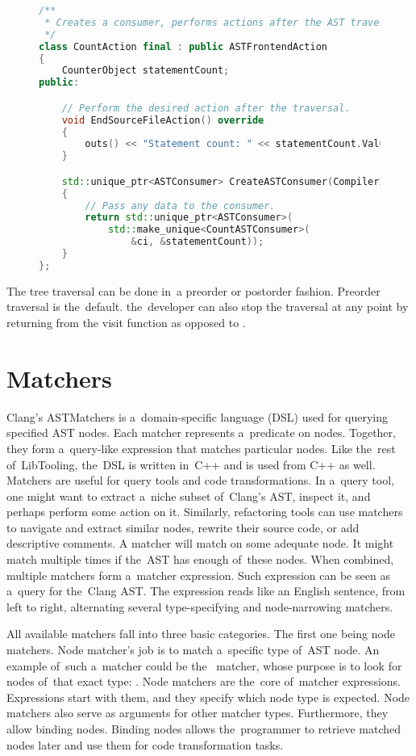 \begin{figure}[ht]\centering
\begin{lstlisting}[caption=ASTFrontendAction., language=C++, 
label={lst:astfrontendaction}]
/**
 * Creates a consumer, performs actions after the AST traversal.
 */
class CountAction final : public ASTFrontendAction
{
	CounterObject statementCount;
public:

	// Perform the desired action after the traversal.
	void EndSourceFileAction() override
	{
		outs() << "Statement count: " << statementCount.Value << "\n";
	}

	std::unique_ptr<ASTConsumer> CreateASTConsumer(CompilerInstance& ci, StringRef file) override
	{
		// Pass any data to the consumer.
		return std::unique_ptr<ASTConsumer>(
			std::make_unique<CountASTConsumer>(
				&ci, &statementCount));
	}
};
\end{lstlisting}
\end{figure}

The tree traversal can be done in~a preorder or postorder fashion. 
Preorder traversal is the~default. the~developer can also stop
the traversal at any point by returning  from
the visit function as opposed to .

\section{Matchers}

Clang's ASTMatchers \citep{matchers:online} 
is a~domain-specific language (DSL) used for querying 
specified AST nodes. 
Each matcher represents a~predicate on nodes. 
Together, they form a~query-like expression that matches particular nodes. 
Like the~rest of~LibTooling, the~DSL is written in~C++ and is used from 
C++ as well.
Matchers are useful for query tools and code transformations. 
In a~query tool, one might want to extract a~niche subset of~Clang's AST, 
inspect it, and perhaps perform some action on it. 
Similarly, refactoring tools can use matchers to navigate and extract 
similar nodes, rewrite their source code, or add descriptive comments.
A matcher will match on some adequate node. 
It might match multiple times if the~AST has enough of~these nodes. 
When combined, multiple matchers form a~matcher expression. 
Such expression can be seen as a~query for the~Clang AST. 
The expression reads like an English sentence, from left to right, 
alternating several type-specifying and node-narrowing matchers.

All available matchers fall into three basic categories. 
The first one being node matchers. 
Node matcher's job is to match a~specific type of~AST node. 
An example of~such a~matcher could be the~ 
matcher, whose purpose is to look for nodes of~that exact 
type: . 
Node matchers are the~core of~matcher expressions. 
Expressions start with them, and they specify which node type is expected. 
Node matchers also serve as arguments for other matcher types. 
Furthermore, they allow binding nodes. 
Binding nodes allows the~programmer to retrieve matched nodes later and 
use them for code transformation tasks. 

